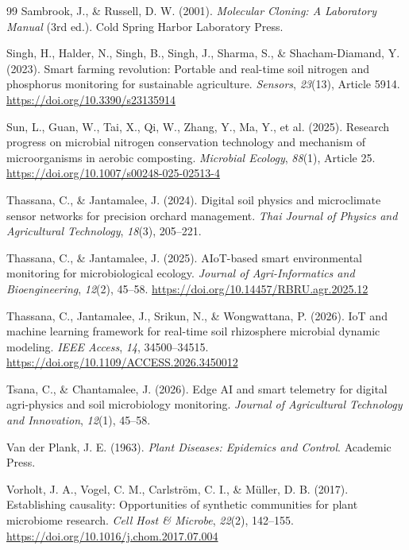 \begin{thebibliography}{99}
 Sambrook, J., \& Russell, D. W. (2001). \textit{Molecular Cloning: A Laboratory Manual} (3rd ed.). Cold Spring Harbor Laboratory Press.

 Singh, H., Halder, N., Singh, B., Singh, J., Sharma, S., \& Shacham-Diamand, Y. (2023). Smart farming revolution: Portable and real-time soil nitrogen and phosphorus monitoring for sustainable agriculture. \textit{Sensors}, \textit{23}(13), Article 5914. \url{https://doi.org/10.3390/s23135914}

 Sun, L., Guan, W., Tai, X., Qi, W., Zhang, Y., Ma, Y., et al. (2025). Research progress on microbial nitrogen conservation technology and mechanism of microorganisms in aerobic composting. \textit{Microbial Ecology}, \textit{88}(1), Article 25. \url{https://doi.org/10.1007/s00248-025-02513-4}

 Thassana, C., \& Jantamalee, J. (2024). Digital soil physics and microclimate sensor networks for precision orchard management. \textit{Thai Journal of Physics and Agricultural Technology}, \textit{18}(3), 205--221.

 Thassana, C., \& Jantamalee, J. (2025). AIoT-based smart environmental monitoring for microbiological ecology. \textit{Journal of Agri-Informatics and Bioengineering}, \textit{12}(2), 45--58. \url{https://doi.org/10.14457/RBRU.agr.2025.12}

 Thassana, C., Jantamalee, J., Srikun, N., \& Wongwattana, P. (2026). IoT and machine learning framework for real-time soil rhizosphere microbial dynamic modeling. \textit{IEEE Access}, \textit{14}, 34500--34515. \url{https://doi.org/10.1109/ACCESS.2026.3450012}

 Tsana, C., \& Chantamalee, J. (2026). Edge AI and smart telemetry for digital agri-physics and soil microbiology monitoring. \textit{Journal of Agricultural Technology and Innovation}, \textit{12}(1), 45--58.

 Van der Plank, J. E. (1963). \textit{Plant Diseases: Epidemics and Control}. Academic Press.

 Vorholt, J. A., Vogel, C. M., Carlström, C. I., \& Müller, D. B. (2017). Establishing causality: Opportunities of synthetic communities for plant microbiome research. \textit{Cell Host \& Microbe}, \textit{22}(2), 142--155. \url{https://doi.org/10.1016/j.chom.2017.07.004}


\end{thebibliography}
